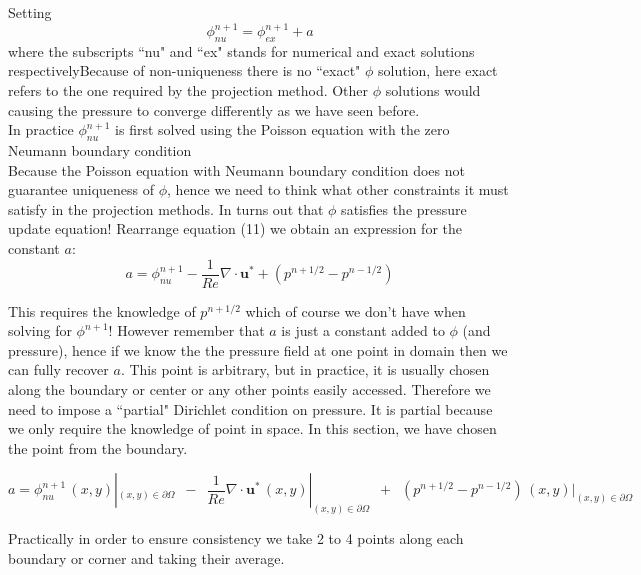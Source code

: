 Setting 
\begin{equation}
\phi^{n+1}_{nu} = \phi^{n+1}_{ex} + a
\end{equation}
where the subscripts ``nu" and ``ex" stands for numerical and exact solutions respectivelyBecause of non-uniqueness there is no ``exact" $\phi$ solution, here exact refers to the one required by the projection method. Other $\phi$ solutions would causing the pressure to converge differently as we have seen before.\\

In practice $\phi^{n+1}_{nu}$ is first solved using the Poisson equation with the zero Neumann boundary condition\\

Because the Poisson equation with Neumann boundary condition does not guarantee uniqueness of $\phi$, hence we need to think what other constraints it must satisfy in the projection methods. In turns out that $\phi$ satisfies the pressure update equation! Rearrange equation (11) we obtain an expression for the constant $a$:
\begin{equation}
a = \phi^{n+1}_{nu} - \dfrac{1}{Re} \nabla \cdot \textbf{u}^* + (p^{n+1/2} - p^{n-1/2})
\end{equation}

This requires the knowledge of $p^{n+1/2}$ which of course we don't have when solving for $\phi^{n+1}$! However remember that $a$ is just a constant added to $\phi$ (and pressure), hence if we know the the pressure field at one point in domain then we can fully recover $a$. This point is arbitrary, but in practice, it is usually chosen along the boundary or center or any other points easily accessed. Therefore we need to impose a ``partial" Dirichlet condition on pressure. It is partial because we only require the knowledge of point in space. In this section, we have chosen the point from the boundary.

\begin{equation}
a = \phi^{n+1}_{nu}\,(x,y)|_{(x,y)\in \partial\Omega} \,\,\,-\,\,\, \dfrac{1}{Re} \nabla \cdot \textbf{u}^*\,(x,y)|_{(x,y)\in \partial\Omega}\,\,\, +\,\,\, (p^{n+1/2} - p^{n-1/2})\,(x,y)|_{(x,y)\in \partial\Omega}
\end{equation}

Practically in order to ensure consistency we take 2 to 4 points along each boundary or corner and taking their average. \\

